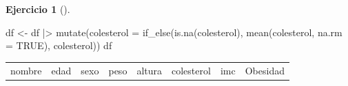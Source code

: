 \documentclass[
  a4paper,
]{scrreport}
\newenvironment{Shaded}{\begin{snugshade}}{\end{snugshade}}
\newcommand{\AttributeTok}[1]{\textcolor[rgb]{0.40,0.45,0.13}{#1}}
\newcommand{\ConstantTok}[1]{\textcolor[rgb]{0.56,0.35,0.01}{#1}}
\newcommand{\FunctionTok}[1]{\textcolor[rgb]{0.28,0.35,0.67}{#1}}
\newcommand{\NormalTok}[1]{\textcolor[rgb]{0.00,0.23,0.31}{#1}}
\newcommand{\OtherTok}[1]{\textcolor[rgb]{0.00,0.23,0.31}{#1}}
\newcommand{\SpecialCharTok}[1]{\textcolor[rgb]{0.37,0.37,0.37}{#1}}
\theoremstyle{definition}
\newtheorem{exercise}{Ejercicio}[chapter]
\theoremstyle{remark}
\begin{document}
\begin{exercise}[]
\begin{enumerate}
\begin{tcolorbox}
\begin{Shaded}
\begin{Highlighting}[]
\NormalTok{df }\OtherTok{\textless{}{-}}\NormalTok{ df }\SpecialCharTok{|\textgreater{}}
    \FunctionTok{mutate}\NormalTok{(}\AttributeTok{colesterol =} \FunctionTok{if\_else}\NormalTok{(}\FunctionTok{is.na}\NormalTok{(colesterol), }\FunctionTok{mean}\NormalTok{(colesterol, }\AttributeTok{na.rm =} \ConstantTok{TRUE}\NormalTok{), colesterol))}
\NormalTok{df}
\end{Highlighting}
\end{Shaded}

  \begin{longtable}[]{@{}
    >{\raggedright\arraybackslash}p{}
    >{\raggedleft\arraybackslash}p{}
    >{\raggedright\arraybackslash}p{}
    >{\raggedleft\arraybackslash}p{}
    >{\raggedleft\arraybackslash}p{}
    >{\raggedleft\arraybackslash}p{}
    >{\raggedleft\arraybackslash}p{}
    >{\raggedright\arraybackslash}p{}@{}}
  \toprule\noalign{}
  \begin{minipage}[b]{\linewidth}\raggedright
  nombre
  \end{minipage} & \begin{minipage}[b]{\linewidth}\raggedleft
  edad
  \end{minipage} & \begin{minipage}[b]{\linewidth}\raggedright
  sexo
  \end{minipage} & \begin{minipage}[b]{\linewidth}\raggedleft
  peso
  \end{minipage} & \begin{minipage}[b]{\linewidth}\raggedleft
  altura
  \end{minipage} & \begin{minipage}[b]{\linewidth}\raggedleft
  colesterol
  \end{minipage} & \begin{minipage}[b]{\linewidth}\raggedleft
  imc
  \end{minipage} & \begin{minipage}[b]{\linewidth}\raggedright
  Obesidad
  \end{minipage} \\

\end{longtable}
\end{tcolorbox}
\end{enumerate}
\end{exercise}
\end{document}

